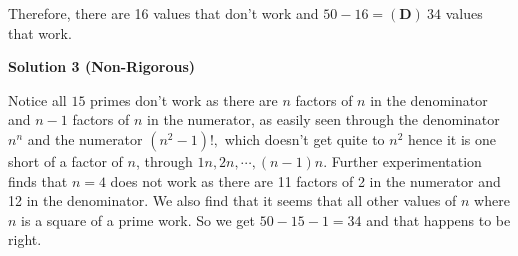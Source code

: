 \begin{enumerate}
 Therefore, there are 16 values that don't work and $50-16 = \boxed{\mathbf{(D)}\ 34}$ values that work.

 



\textbf{Solution 3 (Non-Rigorous)}

Notice all $15$ primes don't work as there are $n$ factors of $n$ in the denominator and $n-1$ factors of $n$ in the numerator, as easily seen through the denominator $n^n$ and the numerator $(n^2-1)!,$ which doesn't get quite to $n^2$ hence it is one short of a factor of $n$, through $1n, 2n, \cdots, (n-1)n$. Further experimentation finds that $n=4$ does not work as there are 11 factors of 2 in the numerator and 12 in the denominator. We also find that it seems that all other values of $n$ where $n$ is a square of a prime work. So we get $50-15-1=\boxed{34}$ and that happens to be right. 

 


\end{enumerate}